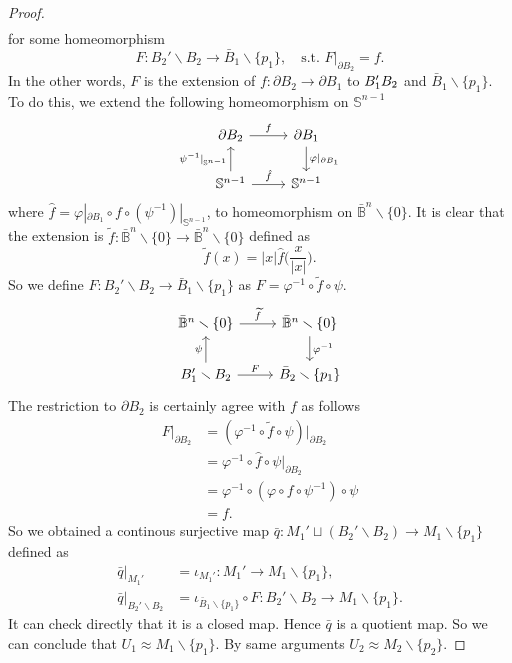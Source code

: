 \documentclass[a4paper]{article}
\theoremstyle{remark}
\newcommand{\s}{\mathbb{S}} %
\newcommand{\closedball}{\bar{\mathbb{B}}} %
\newcommand{\doo}{\partial}    %
\begin{document}
\begin{proof}
\begin{align*}
    \end{align*}
    for some homeomorphism 
    $$
    F : B_2' \smallsetminus B_2 \to \bar{B}_1 \smallsetminus \{p_1\},\quad \text{s.t. }F|_{\doo B_2} = f.
    $$
    In the other words, $F$ is the extension of $f: \doo B_2 \to \doo B_1$ to $B_1' \small B_2$ and $\bar{B}_1 \smallsetminus \{p_1\}$. To do this, we extend the following homeomorphism on $\s^{n-1}$
    \[
    \begin{tikzcd}
    \doo B_2 \arrow[r,"f"] & \doo B_1 \arrow[d,"\varphi|_{\doo B_1}"] \\
    \s^{n-1} \arrow[u,"\psi^{-1}|_{\s^{n-1}}"] \arrow[r,"\hat{f}"] & \s^{n-1}
    \end{tikzcd}
    \]
    where $\hat{f} = \varphi|_{\doo B_1} \circ f \circ (\psi^{-1})|_{\s^{n-1}}$, to homeomorphism on $\closedball^n\smallsetminus \{0\}$. It is clear that the extension is $\widetilde{f} : \closedball^n\smallsetminus \{0\} \to \closedball^n\smallsetminus \{0\}$ defined as
    $$
    \widetilde{f}(x) = |x| \hat{f}\bigg(\frac{x}{|x|}\bigg).
    $$
    So we define $F : B_2' \smallsetminus B_2 \to \bar{B}_1 \smallsetminus \{p_1\}$ as $F = \varphi^{-1} \circ \widetilde{f} \circ \psi$.
    \[
    \begin{tikzcd}
    \closedball^n\smallsetminus \{0\}  \arrow[r,"\widetilde{f}"] & \closedball^n\smallsetminus \{0\} \arrow[d,"\varphi^{-1}"] \\
    B_1'\smallsetminus B_2 \arrow[u,"\psi"] \arrow[r,"F"] & \bar{B}_2 \smallsetminus \{p_1\}
    \end{tikzcd}
    \]
    The restriction to $\doo B_2$ is certainly agree with $f$ as follows
    \begin{align*}
    F|_{\doo B_2} &= ( \varphi^{-1} \circ \widetilde{f} \circ \psi)|_{\doo B_2} \\
    &= \varphi^{-1} \circ \hat{f} \circ \psi|_{\doo B_2} \\
    &= \varphi^{-1} \circ (\varphi \circ f \circ \psi^{-1}) \circ \psi \\
    &= f.
    \end{align*}
    So we obtained a continous surjective map $\bar{q}: M_1' \sqcup (B_2' \smallsetminus B_2) \to M_1 \smallsetminus \{p_1\} $ defined as
    \begin{align*}
    \bar{q}|_{M_1'}&= \iota_{M_1'} : M_1' \to M_1 \smallsetminus \{p_1\},\\
    \bar{q}|_{B_2' \smallsetminus B_2} &= \iota_{\bar{B}_1 \smallsetminus \{p_1\}} \circ F : B_2' \smallsetminus B_2 \to M_1\smallsetminus \{p_1\}.
    \end{align*}
    It can check directly that it is a closed map. Hence $\bar{q}$ is a quotient map. So we can conclude that  $U_1 \approx M_1 \smallsetminus \{p_1\}$. By same arguments $U_2 \approx M_2 \smallsetminus \{p_2\}$.
    

\end{proof}
\end{document}
